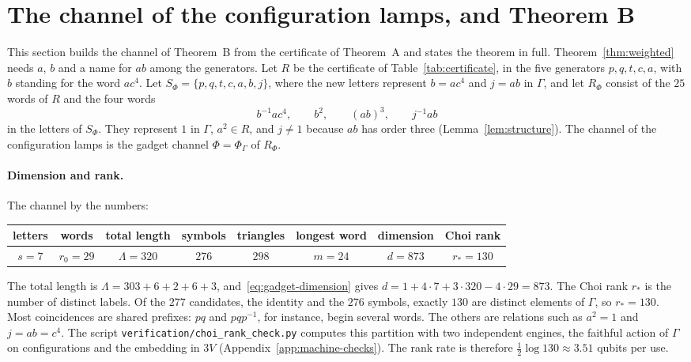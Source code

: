 \section{The channel of the configuration lamps, and Theorem B}\label{sec:lamp-channel}

This section builds the channel of Theorem~B from the certificate of Theorem~A and states the theorem in full.
Theorem~\ref{thm:weighted} needs $a$, $b$ and a name for $ab$ among the generators. Let $R$ be the certificate of Table~\ref{tab:certificate}, in
the five generators $p,q,t,c,a$, with $b$ standing for the word $ac^4$. Let $S_\Phi=\{p,q,t,c,a,b,j\}$, where the new letters represent
$b=ac^4$ and $j=ab$ in $\Gamma$, and let $R_\Phi$ consist of the $25$ words of $R$ and the four words
\[
b^{-1}ac^4,\qquad b^2,\qquad (ab)^3,\qquad j^{-1}ab
\]
in the letters of $S_\Phi$. They represent $1$ in $\Gamma$, $a^2\in R$, and $j\ne1$ because $ab$ has order three (Lemma~\ref{lem:structure}). The
channel of the configuration lamps is the gadget channel $\Phi=\Phi_\Gamma$ of $R_\Phi$.

\paragraph{Dimension and rank.} The channel by the numbers:
\begin{center}\small
\begin{tabular}{cccccccc}
\toprule
letters & words & total length & symbols & triangles & longest word & dimension & Choi rank\\
\midrule
$s=7$ & $r_0=29$ & $\Lambda=320$ & $276$ & $298$ & $m=24$ & $d=873$ & $r_*=130$\\
\bottomrule
\end{tabular}
\end{center}
The total length is $\Lambda=303+6+2+6+3$, and~\eqref{eq:gadget-dimension} gives $d=1+4\cdot7+3\cdot320-4\cdot29=873$. The Choi rank $r_*$ is
the number of distinct labels. Of the $277$ candidates, the identity and the $276$ symbols, exactly $130$ are distinct elements of
$\Gamma$, so $r_*=130$. Most coincidences are shared prefixes: $pq$ and $pqp^{-1}$, for instance, begin several words. The others are relations
such as $a^2=1$ and $j=ab=c^4$. The script \texttt{verification/choi\_rank\_check.py} computes this partition with two independent engines,
the faithful action of $\Gamma$ on configurations and the embedding in $3V$ (Appendix~\ref{app:machine-checks}). The rank rate is therefore
$\frac12\log130\approx3.51$ qubits per use.

